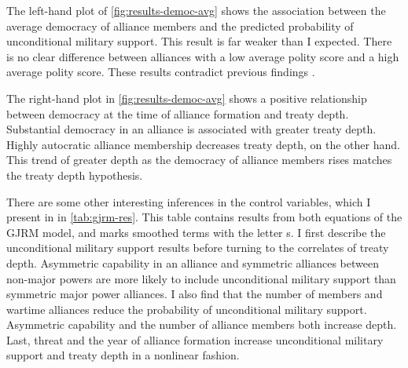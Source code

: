 \documentclass[12pt]{article}
\begin{document}
The left-hand plot of \autoref{fig:results-democ-avg} shows the association between the average democracy of alliance members and the predicted probability of unconditional military support. 
This result is far weaker than I expected.  
There is no clear difference between alliances with a low average polity score and a high average polity score. 
These results contradict previous findings \citep{Mattes2012, Chibaetal2015}.


The right-hand plot in \autoref{fig:results-democ-avg} shows a positive relationship between democracy at the time of alliance formation and treaty depth.
Substantial democracy in an alliance is associated with greater treaty depth. 
Highly autocratic alliance membership decreases treaty depth, on the other hand. 
This trend of greater depth as the democracy of alliance members rises matches the treaty depth hypothesis. 


There are some other interesting inferences in the control variables, which I present in in \autoref{tab:gjrm-res}. 
This table contains results from both equations of the GJRM model, and marks smoothed terms with the letter s. 
I first describe the unconditional military support results before turning to the correlates of treaty depth. 
Asymmetric capability in an alliance and symmetric alliances between non-major powers are more likely to include unconditional military support than symmetric major power alliances. 
I also find that the number of members and wartime alliances reduce the probability of unconditional military support. 
Asymmetric capability and the number of alliance members both increase depth. 
Last, threat and the year of alliance formation increase unconditional military support and treaty depth in a nonlinear fashion. 
\end{document}

